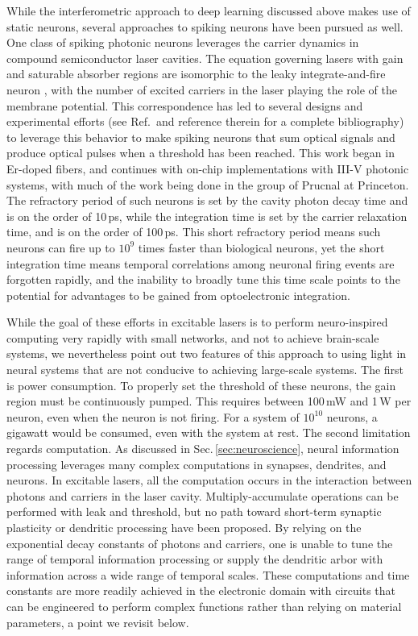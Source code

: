 While the interferometric approach to deep learning discussed above makes use of static neurons, several approaches to spiking neurons have been pursued as well. One class of spiking photonic neurons leverages the carrier dynamics in compound semiconductor laser cavities. The equation governing lasers with gain and saturable absorber regions are isomorphic to the leaky integrate-and-fire neuron \cite{dukr1999}, with the number of excited carriers in the laser playing the role of the membrane potential. This correspondence has led to several designs \cite{nata2013} and experimental efforts (see Ref.\,\cite{prsh2017} and reference therein for a complete bibliography) to leverage this behavior to make spiking neurons that sum optical signals and produce optical pulses when a threshold has been reached. This work began in Er-doped fibers, and continues with on-chip implementations with III-V photonic systems, with much of the work being done in the group of Prucnal at Princeton. The refractory period of such neurons is set by the cavity photon decay time and is on the order of 10\,ps, while the integration time is set by the carrier relaxation time, and is on the order of 100\,ps. This short refractory period means such neurons can fire up to $10^9$ times faster than biological neurons, yet the short integration time means temporal correlations among neuronal firing events are forgotten rapidly, and the inability to broadly tune this time scale points to the potential for advantages to be gained from optoelectronic integration. 

While the goal of these efforts in excitable lasers is to perform neuro-inspired computing very rapidly with small networks, and not to achieve brain-scale systems, we nevertheless point out two features of this approach to using light in neural systems that are not conducive to achieving large-scale systems. The first is power consumption. To properly set the threshold of these neurons, the gain region must be continuously pumped. This requires between 100\,mW and 1\,W per neuron, even when the neuron is not firing. For a system of $10^{10}$ neurons, a gigawatt would be consumed, even with the system at rest. The second limitation regards computation. As discussed in Sec.\,\ref{sec:neuroscience}, neural information processing leverages many complex computations in synapses, dendrites, and neurons. In excitable lasers, all the computation occurs in the interaction between photons and carriers in the laser cavity. Multiply-accumulate operations can be performed with leak and threshold, but no path toward short-term synaptic plasticity or dendritic processing have been proposed. By relying on the exponential decay constants of photons and carriers, one is unable to tune the range of temporal information processing or supply the dendritic arbor with information across a wide range of temporal scales. These computations and time constants are more readily achieved in the electronic domain with circuits that can be engineered to perform complex functions rather than relying on material parameters, a point we revisit below.

